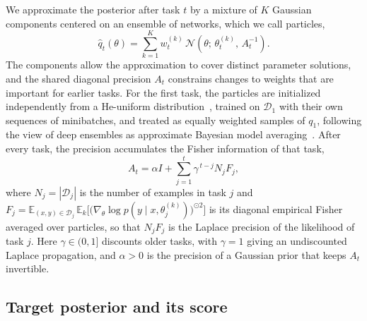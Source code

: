 We approximate the posterior after task $t$ by a mixture of $K$ Gaussian
components centered on an ensemble of networks, which we call particles,
\begin{equation}
    \hat q_t(\theta)=\sum_{k=1}^{K}w_t^{(k)}\,
    \mathcal{N}\!\left(\theta;\,\theta_t^{(k)},\,A_t^{-1}\right).
    \label{eq:mixture}
\end{equation}
The components allow the approximation to cover distinct parameter solutions,
and the shared diagonal precision $A_t$ constrains changes to weights that are
important for earlier tasks. For the first task, the particles are initialized
independently from a He-uniform distribution~\cite{he2015delving}, trained on
$\mathcal{D}_1$ with their own sequences of minibatches, and treated as equally
weighted samples of $q_1$, following the view of deep ensembles as approximate
Bayesian model
averaging~\cite{lakshminarayanan2017ensembles,wilson2020bayesian}. After every
task, the precision accumulates the Fisher information of that task,
\begin{equation}
    A_t=\alpha I+\sum_{j=1}^{t}\gamma^{\,t-j}N_jF_j,
    \label{eq:precision}
\end{equation}
where $N_j=|\mathcal{D}_j|$ is the number of examples in task $j$ and
$F_j=\mathbb{E}_{(x,y)\in\mathcal{D}_j}\,\mathbb{E}_{k}\big[\big(\nabla_\theta\log
p(y\mid x,\theta_j^{(k)})\big)^{\odot2}\big]$ is its diagonal empirical Fisher
averaged over particles, so that $N_jF_j$ is the Laplace precision of the
likelihood of task $j$. Here $\gamma\in(0,1]$ discounts older tasks, with
$\gamma=1$ giving an undiscounted Laplace propagation, and $\alpha>0$ is the
precision of a Gaussian prior that keeps $A_t$ invertible.

\subsection{Target posterior and its score}
\label{sec:target}

